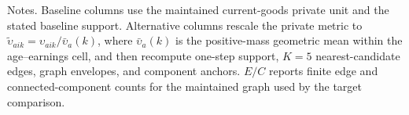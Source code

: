 \begin{table}[t]
\centering
\caption{Target comparisons after recomputing an alternative private-unit graph}
\label{tab:alternative-normalization}
\footnotesize
\renewcommand{\arraystretch}{1.08}
\begin{minipage}{0.98\textwidth}
\footnotesize Notes. Baseline columns use the maintained current-goods private unit and the stated baseline support. Alternative columns rescale the private metric to $\widetilde\upsilon_{aik}=\upsilon_{aik}/\bar\upsilon_a(k)$, where $\bar\upsilon_a(k)$ is the positive-mass geometric mean within the age--earnings cell, and then recompute one-step support, $K=5$ nearest-candidate edges, graph envelopes, and component anchors. $E/C$ reports finite edge and connected-component counts for the maintained graph used by the target comparison.
\end{minipage}
\end{table}
